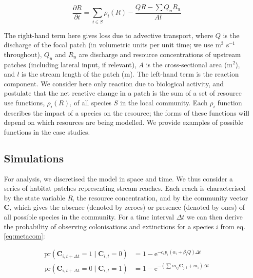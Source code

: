 \documentclass[11pt,a4paper]{article}
\begin{document}
\begin{equation}
	\frac{\partial R}{\partial t} = \sum_{i \in S}{\rho_i(R)} -\frac{QR - \sum Q_u R_u}{A l} 
	\label{eq:rxn_transport}
\end{equation}

The right-hand term here gives loss due to advective transport, where $Q$ is the discharge of the focal patch (in volumetric units per unit time; we use m$^3$ s$^{-1}$ throughout), $Q_u$ and $R_u$ are discharge and resource concentrations of upstream patches (including lateral input, if relevant), $A$ is the cross-sectional area (m$^2$), and $l$ is the stream length of the patch (m).
The left-hand term is the reaction component.
We consider here only reaction due to biological activity, and postulate that the net reactive change in a patch is the sum of a set of resource use functions, $\rho_i(R)$, of all species $S$ in the local community. 
Each $\rho_i$ function describes the impact of a species on the resource; the forms of these functions will depend on which resources are being modelled.
We provide examples of possible functions in the case studies.


\subsection{Simulations}

For analysis, we discretised the model in space and time.
We thus consider a series of habitat patches representing stream reaches.
Each reach is characterised by the state variable $R$, the resource concentration, and by the community vector $\mathbf{C}$, which gives the absence (denoted by zeroes) or presence (denoted by ones) of all possible species in the community.
For a time interval $\Delta t$ we can then derive the probability of observing colonisations and extinctions for a species $i$ from eq. \ref{eq:metacom}:

\begin{equation}
\begin{split}
	\mathrm{pr}\left( \mathbf{C}_{i, t+\Delta t} = 1 \mid \mathbf{C}_{i, t} = 0\right) &= 
			1 - \mathrm{e}^{-c_i p_i(\alpha_i + \beta_iQ) \Delta t} \\
	\mathrm{pr}\left( \mathbf{C}_{i, t+\Delta t} = 0 \mid \mathbf{C}_{i, t} = 1\right) &= 
			1 - \mathrm{e}^{-\left( \sum{m_{ij}\mathbf{C}_{j, t}} + m_i \right)\Delta t}
	\label{eq:ceprob}
\end{split}
\end{equation}
\end{document}
